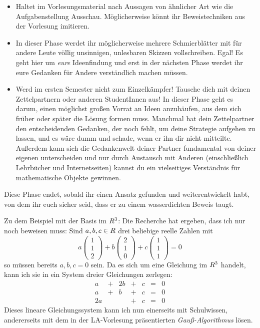 \begin{phasetwo}[Rumprobieren]
\begin{itemize}
        \item Haltet im Vorlesungsmaterial nach Aussagen von ähnlicher Art wie die Aufgabenstellung Ausschau. Möglicherweise könnt ihr Beweistechniken aus der Vorlesung imitieren.
        \item In dieser Phase werdet ihr möglicherweise mehrere Schmierblätter mit für andere Leute völlig unsinnigen, unlesbaren Skizzen vollschreiben. Egal! Es geht hier um \emph{eure} Ideenfindung und erst in der nächsten Phase werdet ihr eure Gedanken für Andere verständlich machen müssen.
        \item Werd im ersten Semester nicht zum Einzelkämpfer! Tausche dich mit deinen Zettelpartnern oder anderen StudentInnen aus! In dieser Phase geht es darum, einen möglichst großen Vorrat an Ideen anzuhäufen, aus dem sich früher oder später die Lösung formen muss. Manchmal hat dein Zettelpartner den entscheidenden Gedanken, der noch fehlt, um deine Strategie aufgehen zu lassen, und es wäre dumm und schade, wenn er ihn dir nicht mitteilte. Außerdem kann sich die Gedankenwelt deiner Partner fundamental von deiner eigenen unterscheiden und nur durch Austausch mit Anderen (einschließlich Lehrbücher und Internetseiten) kannst du ein vielseitiges Verständnis für mathematische Objekte gewinnen.
    \end{itemize}
    Diese Phase endet, sobald ihr einen Ansatz gefunden und weiterentwickelt habt, von dem ihr euch sicher seid, dass er zu einem wasserdichten Beweis taugt.

    Zu dem Beispiel mit der Basis im $\relax R^3$: Die Recherche hat ergeben, dass ich nur noch beweisen muss: Sind $a,b,c\in \relax R$ drei beliebige reelle Zahlen mit
        \[ a\begin{pmatrix} 1 \\ 1 \\ 2 \end{pmatrix} + b \begin{pmatrix} 2 \\ 1 \\ 0 \end{pmatrix}+c \begin{pmatrix} 1 \\ 1 \\ 1 \end{pmatrix} = 0  \]
    so müssen bereits $a,b,c=0$ sein. Da es sich um eine Gleichung im $\relax R^3$ handelt, kann ich sie in ein System dreier Gleichungen zerlegen:
    \[\begin{array}{ccccccc}
        a &+& 2b &+& c &=& 0 \\
        a &+& b &+& c & =& 0 \\
        2a && &+ &c & =& 0
    \end{array}\]
    Dieses lineare Gleichungssystem kann ich nun einerseits mit Schulwissen, andererseits mit dem in der LA-Vorlesung präsentierten \emph{Gauß-Algorithmus} lösen.


\end{phasetwo}
